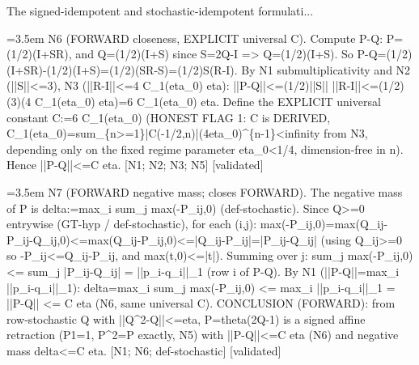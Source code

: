 \documentclass{article}
\newcommand{\step}[1]{\par\noindent\hangindent=3.5em\hangafter=1%
  \makebox[3.5em][l]{\textbf{#1.}}}
\newcommand{\steptag}[1]{\hfill{\small\textsf{[#1]}}}
\begin{document}
\begin{proofbox}{The signed-idempotent and stochastic-idempotent formulati...}
\step{1.6} N6 (FORWARD closeness, EXPLICIT universal C). Compute P-Q: P=(1/2)(I+SR), and Q=(1/2)(I+S) since S=2Q-I => Q=(1/2)(I+S). So P-Q=(1/2)(I+SR)-(1/2)(I+S)=(1/2)(SR-S)=(1/2)S(R-I). By N1 submultiplicativity and N2 (||S||<=3), N3 (||R-I||<=4 C\_1(eta\_0) eta): ||P-Q||<=(1/2)||S|| ||R-I||<=(1/2)(3)(4 C\_1(eta\_0) eta)=6 C\_1(eta\_0) eta. Define the EXPLICIT universal constant C:=6 C\_1(eta\_0) (HONEST FLAG 1: C is DERIVED, C\_1(eta\_0)=sum\_\{n>=1\}|C(-1/2,n)|(4eta\_0)\textasciicircum{}\{n-1\}<infinity from N3, depending only on the fixed regime parameter eta\_0<1/4, dimension-free in n). Hence ||P-Q||<=C eta. [N1; N2; N3; N5] \steptag{validated} \\[4pt]
\step{1.7} N7 (FORWARD negative mass; closes FORWARD). The negative mass of P is delta:=max\_i sum\_j max(-P\_ij,0) (def-stochastic). Since Q>=0 entrywise (GT-hyp / def-stochastic), for each (i,j): max(-P\_ij,0)=max(Q\_ij-P\_ij-Q\_ij,0)<=max(Q\_ij-P\_ij,0)<=|Q\_ij-P\_ij|=|P\_ij-Q\_ij| (using Q\_ij>=0 so -P\_ij<=Q\_ij-P\_ij, and max(t,0)<=|t|). Summing over j: sum\_j max(-P\_ij,0) <= sum\_j |P\_ij-Q\_ij| = ||p\_i-q\_i||\_1 (row i of P-Q). By N1 (||P-Q||=max\_i ||p\_i-q\_i||\_1): delta=max\_i sum\_j max(-P\_ij,0) <= max\_i ||p\_i-q\_i||\_1 = ||P-Q|| <= C eta (N6, same universal C). CONCLUSION (FORWARD): from row-stochastic Q with ||Q\textasciicircum{}2-Q||<=eta, P=theta(2Q-1) is a signed affine retraction (P1=1, P\textasciicircum{}2=P exactly, N5) with ||P-Q||<=C eta (N6) and negative mass delta<=C eta. [N1; N6; def-stochastic] \steptag{validated} \\[4pt]

\end{proofbox}
\end{document}
